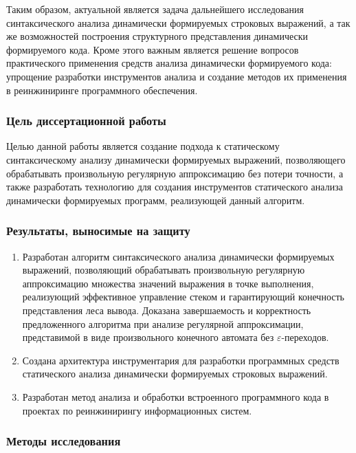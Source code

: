Таким образом, актуальной является задача дальнейшего исследования синтаксического анализа динамически формируемых строковых выражений, а так же возможностей построения структурного представления динамически формируемого кода. Кроме этого важным является решение вопросов практического применения средств анализа динамически формируемого кода: упрощение разработки инструментов анализа и создание методов их применения в реинжиниринге программного обеспечения.

\subsubsection*{\large{Цель диссертационной работы}}

Целью данной работы является создание подхода к статическому синтаксическому анализу динамически формируемых выражений, позволяющего обрабатывать произвольную регулярную аппроксимацию без потери точности, а также разработать технологию для создания инструментов статического анализа динамически формируемых программ, реализующей данный алгоритм.

\subsubsection*{\large{Результаты, выносимые на защиту}}
\begin{enumerate}
    \item Разработан алгоритм синтаксического анализа динамически формируемых выражений, позволяющий обрабатывать произвольную регулярную аппроксимацию множества значений выражения в точке выполнения, реализующий 
    эффективное управление стеком и гарантирующий конечность представления леса вывода. Доказана завершаемость и корректность предложенного алгоритма при анализе регулярной аппроксимации, представимой в виде произвольного конечного автомата без $\varepsilon$-переходов. 
    \item Создана архитектура инструментария для разработки программных средств статического анализа динамически формируемых строковых выражений.
    \item Разработан метод анализа и обработки встроенного программного кода в проектах по реинжинирингу информационных систем. 
\end{enumerate}

\subsubsection*{\large{Методы исследования}}

